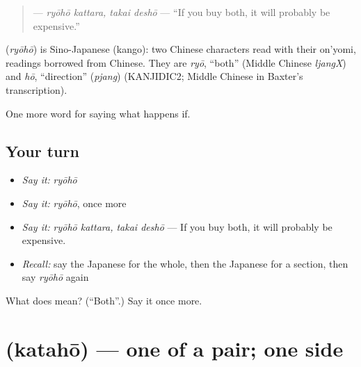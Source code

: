 \begin{quote}
\textbf{ } — \emph{ryōhō kattara, takai deshō} — \textquotedblleft{}If you buy both, it will probably be expensive.\textquotedblright{}
\end{quote}

\begin{cousinweb}
\textbf{} (\emph{ryōhō}) is Sino-Japanese (kango): two Chinese characters read with their on'yomi, readings borrowed from Chinese. They are \emph{ryō}, \textquotedblleft{}both\textquotedblright{} (Middle Chinese \emph{ljangX}) and \emph{hō}, \textquotedblleft{}direction\textquotedblright{} (\emph{pjang}) (KANJIDIC2; Middle Chinese in Baxter's transcription).
\end{cousinweb}

\begin{grammarlens}[title={What you've built}]
One more word for saying what happens if.
\end{grammarlens}

\subsection*{Your turn}
\begin{itemize}
\raggedright
  \item \emph{Say it:} \emph{ryōhō}
  \item \emph{Say it:} \emph{ryōhō}, once more
  \item \emph{Say it:} \emph{ryōhō kattara, takai deshō} — If you buy both, it will probably be expensive.
  \item \emph{Recall:} say the Japanese for the whole, then the Japanese for a section, then say \emph{ryōhō} again
\end{itemize}

\begin{tcolorbox}[breakable,colback=teal!4,colframe=teal!35!black,title={Before you move on}]
What does  mean? (\textquotedblleft{}Both\textquotedblright{}.) Say it once more.
\end{tcolorbox}
\section[\texorpdfstring{\ja{かたほう} (katahō)}{かたほう (katahō)}]{ (katahō) — one of a pair; one side}

\label{lesson:JA-C368-katahou}



